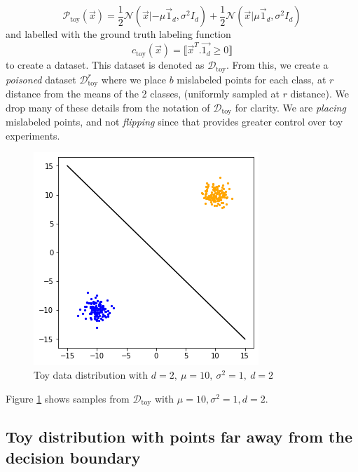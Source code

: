 \documentclass[12pt, oneside]{book}
\begin{document}
\begin{equation*}
    \mathcal{P}_\text{toy}(\vec{x})=\frac{1}{2} \mathcal{N}(\vec{x}|-\mu \vec{1}_d,
    \sigma^2 I_d) + \frac{1}{2} \mathcal{N}(\vec{x}| \mu \vec{1}_d, \sigma^2 I_d)
\end{equation*}
and labelled with the ground truth labeling function 
\begin{equation*}
    c_\text{toy}(\vec{x}) = \llbracket
    \vec{x}^T.\vec{1_d} \geq 0 \rrbracket 
\end{equation*}
to create a dataset. This dataset is denoted as $\mathcal{D}_\text{toy}$. From
this, we create a \emph{poisoned} dataset $\mathcal{D}_\text{toy}^r$ where we
place $b$ mislabeled points for each class, at $r$ distance from the means of
the 2 classes, (uniformly sampled at $r$ distance). We drop many of these
details from the notation of $\mathcal{D}_\text{toy}$ for clarity. We are
\emph{placing} mislabeled points, and not \emph{flipping} since that provides
greater control over toy experiments.

\begin{figure}[!h]
    \centering
    \includegraphics[scale=0.4]{sample_data}
    \caption{Toy data distribution with $d=2,~\mu=10,~\sigma^2=1,~d=2$}
    \label{fig:data_sample}
\end{figure}

Figure \ref{fig:data_sample} shows samples from $\mathcal{D}_\text{toy}$ with
$\mu=10, \sigma^2=1, d=2$.


\subsection{Toy distribution with points far away from the decision boundary}
\end{document}

